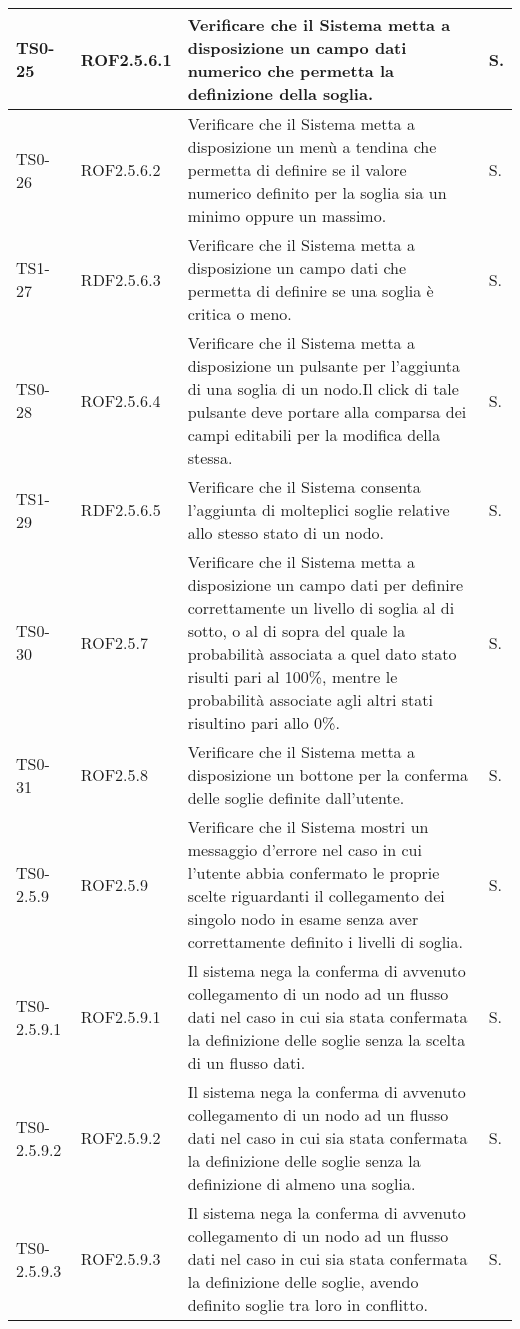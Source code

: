 \begin{longtable}{|C{.15\textwidth}|C{.14\textwidth}|m{.52\textwidth}|m{.08\textwidth}|}
\hline
{}TS0-25 & ROF2.5.6.1 & Verificare che il Sistema metta a disposizione un campo dati numerico che permetta la definizione della soglia. & S. \\ 
\hline
TS0-26 & ROF2.5.6.2 & Verificare che il Sistema metta a disposizione un menù a tendina che permetta di definire se il valore numerico definito per la soglia sia un minimo oppure un massimo. & S. \\
\hline
{}TS1-27 & RDF2.5.6.3  & Verificare che il Sistema metta a disposizione un campo dati che permetta di definire se una soglia è critica o meno.  & S. \\
\hline
TS0-28 & ROF2.5.6.4  & Verificare che il Sistema metta a disposizione un pulsante per l'aggiunta di una soglia di un nodo.Il click di tale pulsante deve portare alla comparsa dei campi editabili per la modifica della stessa. & S. \\
\hline
{}TS1-29 & RDF2.5.6.5  & Verificare che il Sistema consenta l'aggiunta di molteplici soglie relative allo stesso stato di un nodo. & S. \\
\hline
TS0-30& ROF2.5.7 & Verificare che il Sistema metta a disposizione un campo dati per definire correttamente un livello di soglia al di sotto, o al di sopra del quale la probabilità associata a quel dato stato risulti pari al 100\%, mentre le probabilità associate agli altri stati risultino pari allo 0\%. & S. \\
\hline
{}TS0-31 & ROF2.5.8 & Verificare che il Sistema metta a disposizione un bottone per la conferma delle soglie definite dall'utente. & S. \\
\hline
TS0-2.5.9 & ROF2.5.9 & Verificare che il Sistema mostri un messaggio d'errore nel caso in cui l'utente abbia confermato le proprie scelte riguardanti il collegamento dei singolo nodo in esame senza aver correttamente definito i livelli di soglia. & S. \\
\hline
{}TS0-2.5.9.1 & ROF2.5.9.1 & Il sistema nega la conferma di avvenuto collegamento di un nodo ad un flusso dati nel caso in cui sia stata confermata la definizione delle soglie senza la scelta di un flusso dati. & S. \\
\hline
TS0-2.5.9.2 & ROF2.5.9.2  & Il sistema nega la conferma di avvenuto collegamento di un nodo ad un flusso dati nel caso in cui sia stata confermata la definizione delle soglie senza la definizione di almeno una soglia. & S. \\
\hline
{}TS0-2.5.9.3 & ROF2.5.9.3  & Il sistema nega la conferma di avvenuto collegamento di un nodo ad un flusso dati nel caso in cui sia stata confermata la definizione delle soglie, avendo definito soglie tra loro in conflitto. & S. \\

\end{longtable}
